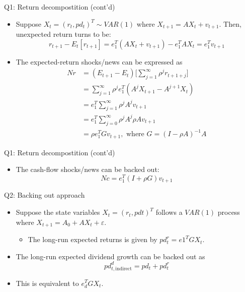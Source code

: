\documentclass[10pt,t]{beamer}
\begin{document}
\begin{frame}{Q1: Return decompostition (cont'd)}
\begin{itemize}
  \item Suppose $X_t = (r_t, pd_t)^T \sim VAR(1)$ where $X_{t+1} = AX_{t} + v_{t+1}$. Then, unexpected return turns to be:
  \begin{equation*}
  r_{t+1} - E_t[r_{t+1}] = e_1^T (AX_t + v_{t+1}) - e_1^T AX_t = e_1^T v_{t+1}
  \end{equation*}
  \item The expected-return shocks/news can be expressed as
  \begin{equation*}
  \begin{split}
  Nr & = (E_{t+1} - E_{t}) \bigg[\sum_{j = 1}^{\infty} \rho^{j} r_{t+1+j}\bigg] \\
  & = \sum_{j = 1}^{\infty} \rho^{j} e_1^T (A^j X_{t+1} - A^{j+1} X_{t}) \\
  & = e_1^T \sum_{j = 1}^{\infty} \rho^{j} A^j v_{t+1} \\
  & = e_1^T \sum_{j = 0}^{\infty} \rho^{j} A^j \rho A v_{t+1} \\
  & = \rho e_1^T G v_{t+1}, \text{ where } G = (I - \rho A)^{-1}A
  \end{split}
  \end{equation*}
\end{itemize}
\end{frame}

\begin{frame}{Q1: Return decompostition (cont'd)}
\begin{itemize}
  \item The cash-flow shocks/news can be backed out:
  \begin{equation*}
  Nc = e_1^T(I + \rho G) v_{t+1}
  \end{equation*}
\end{itemize}
\end{frame}






\begin{frame}{Q2: Backing out approach}
\begin{itemize}
  \item Suppose the state variables $X_t = (r_t, pdt)^T$ follows a $VAR(1)$ process where $X_{t+1} = A_0 + A X_{t} + \varepsilon$.
  \begin{itemize}
    \item The long-run expected returns is given by $pd_t^r = e1^T G X_t$.
  \end{itemize}
  \item The long-run expected dividend growth can be backed out as
  $$
  pd_{t, \text{indirect}}^{d} = pd_t + pd_t^r
  $$
  \item This is equivalent to $e_d^T G X_t$.
\end{itemize}
\end{frame}
\end{document}
